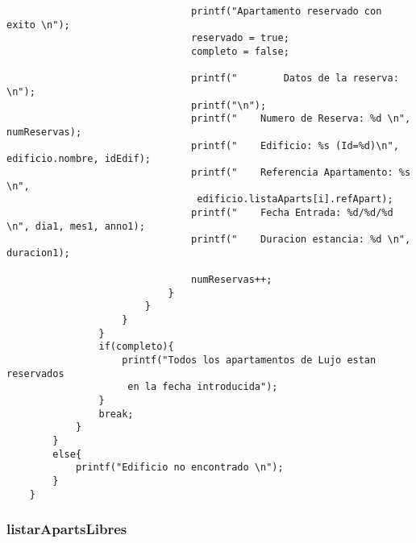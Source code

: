\documentclass[12pt]{article}
\begin{document}
\begin{lstlisting}
								printf("Apartamento reservado con exito \n");
								reservado = true;
								completo = false;
								
								printf("        Datos de la reserva: \n");
								printf("\n");
								printf("    Numero de Reserva: %d \n", numReservas);
								printf("    Edificio: %s (Id=%d)\n", edificio.nombre, idEdif);
								printf("    Referencia Apartamento: %s \n",
								 edificio.listaAparts[i].refApart);
								printf("    Fecha Entrada: %d/%d/%d \n", dia1, mes1, anno1);
								printf("    Duracion estancia: %d \n", duracion1);
								
								numReservas++;
							}
						}
					}
				}
				if(completo){
					printf("Todos los apartamentos de Lujo estan reservados
					 en la fecha introducida");
				}
				break;
			}
		}
		else{
			printf("Edificio no encontrado \n");
		}
	}
	\end{lstlisting}
	
	\subsubsection{listarApartsLibres}
	
\end{document}
